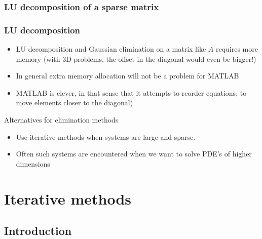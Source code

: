 \begin{frame}[fragile]
  \frametitle{LU decomposition of a sparse matrix}
\end{frame}
  
\begin{frame}[fragile]
  \frametitle{LU decomposition}
  \begin{itemize}
    \item LU decomposition and Gaussian elimination on a matrix like $A$ requires more memory (with 3D problems, the offset in the diagonal would even be bigger!)
    \item In general extra memory allocation will not be a problem for MATLAB
    \item MATLAB is clever, in that sense that it attempts to reorder equations, to move elements closer to the diagonal)
  \end{itemize} \pause
  Alternatives for elimination methods
  \begin{itemize}
    \item Use iterative methods when systems are large and sparse.
    \item Often such systems are encountered when we want to solve PDE’s of higher dimensions
  \end{itemize}
\end{frame}

\section{Iterative methods}
\subsection*{Introduction}

